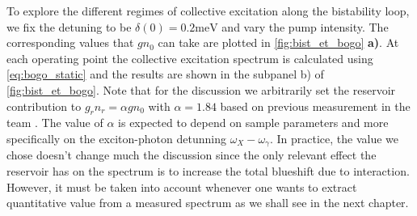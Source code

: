To explore the different regimes of collective excitation along the bistability loop, we fix the detuning to be $\delta(0)=0.2 \mathrm{meV}$ and vary the pump intensity. The corresponding
values that $gn_0$ can take are plotted in \autoref{fig:bist_et_bogo} \textbf{a)}. At each operating point the collective excitation spectrum is calculated using \autoref{eq:bogo_static} and the results are shown in the subpanel b) of \autoref{fig:bist_et_bogo}.
Note that for the discussion we arbitrarily set the reservoir contribution to $g_rn_r=\alpha gn_0$ with $\alpha=1.84$ based on previous measurement in the team \cite{claude_phd}. The value of $\alpha$ is expected to depend on sample parameters and more specifically on the exciton-photon detunning $\omega_X-\omega_\gamma$. In practice, the value we chose doesn't change much the discussion since the only relevant effect the reservoir has on the spectrum is to increase the total blueshift 
due to interaction. However, it must be taken into account whenever one wants to extract quantitative value from a measured spectrum as we shall see in the next chapter.
